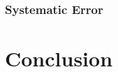 \documentclass[12pt]{report}
\begin{document}
\subsection{Systematic Error}
\label{subsec: Systematic Error}



\chapter{Conclusion}
\label{ch:Conclusion}



\end{document}
